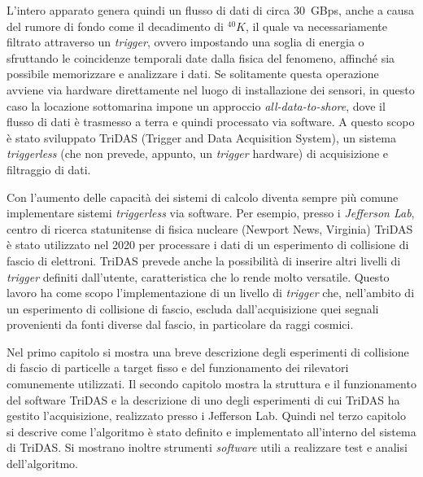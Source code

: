 \documentclass[../main.tex]{subfiles}
\begin{document}
L'intero apparato genera quindi un flusso di dati di circa \SI{30}{GBps}, anche a causa del rumore di fondo come il decadimento di ${}^{40}K$, il quale va necessariamente filtrato attraverso un \emph{trigger}, ovvero impostando una soglia di energia o sfruttando le coincidenze temporali date dalla fisica del fenomeno, affinché sia possibile memorizzare e analizzare i dati. Se solitamente questa operazione avviene via hardware direttamente nel luogo di installazione dei sensori, in questo caso la locazione sottomarina impone un approccio \emph{all-data-to-shore}, dove il flusso di dati è trasmesso a terra e quindi processato via software. A questo scopo è stato sviluppato TriDAS (Trigger and Data Acquisition System), un sistema \emph{triggerless} (che non prevede, appunto, un \emph{trigger} hardware) di acquisizione e filtraggio di dati.

Con l'aumento delle capacità dei sistemi di calcolo diventa sempre più comune implementare sistemi \emph{triggerless} via software. Per esempio, presso i \emph{Jefferson Lab}, centro di ricerca statunitense di fisica nucleare (Newport News, Virginia) TriDAS è stato utilizzato nel 2020 per processare i dati di un esperimento di collisione di fascio di elettroni. TriDAS prevede anche la possibilità di inserire altri livelli di \emph{trigger} definiti dall'utente, caratteristica che lo rende molto versatile. Questo lavoro ha come scopo l'implementazione di un livello di \emph{trigger} che, nell'ambito di un esperimento di collisione di fascio, escluda dall'acquisizione quei segnali provenienti da fonti diverse dal fascio, in particolare da raggi cosmici.


Nel primo capitolo si mostra una breve descrizione degli esperimenti di collisione di fascio di particelle a target fisso e del funzionamento dei rilevatori comunemente utilizzati. 
Il secondo capitolo mostra la struttura e il funzionamento del software TriDAS e la descrizione di uno degli esperimenti di cui TriDAS ha gestito l'acquisizione, realizzato presso i Jefferson Lab.
Quindi nel terzo capitolo si descrive come l'algoritmo è stato definito e implementato all'interno del sistema di TriDAS. Si mostrano inoltre strumenti \emph{software} utili a realizzare test e analisi dell'algoritmo. 
\end{document}
